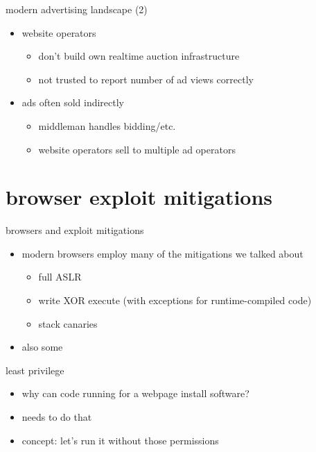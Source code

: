 \begin{frame}{modern advertising landscape (2)}
    \begin{itemize}
        \item website operators 
            \begin{itemize}
            \item don't build own realtime auction infrastructure
            \item not trusted to report number of ad views correctly
            \end{itemize}
        \item ads often sold indirectly
            \begin{itemize}
            \item middleman handles bidding/etc.
            \item website operators sell to multiple ad operators
            \end{itemize}
    \end{itemize}
\end{frame}

\section{browser exploit mitigations}

\begin{frame}{browsers and exploit mitigations}
    \begin{itemize}
    \item modern browsers employ many of the mitigations we talked about
        \begin{itemize}
        \item full ASLR
        \item write XOR execute (with exceptions for runtime-compiled code)
        \item stack canaries
        \end{itemize}
    \item also some 
    \end{itemize}
\end{frame}

\begin{frame}{least privilege}
    \begin{itemize}
    \item why can code running for a webpage install software?
    \item {} needs to do that
        \vspace{.5cm}
    \item concept: let's run it without those permissions
    \end{itemize}
\end{frame}

